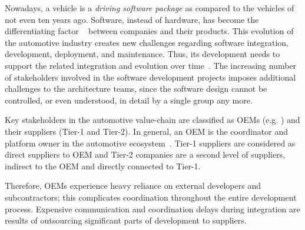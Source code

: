 Nowadays, a vehicle is a {\em driving software package} as compared to the vehicles of not even ten years ago. %
Software, instead of hardware, has become the differentiating factor%
~\cite{ConnectedVehicle2012,hbr2015hardwaresoftware,Mossinger2010SoftwareAutomotive,Broy:2006:CAS:1134285.1134292} %
between companies and their products. This evolution of the automotive industry %
creates new challenges regarding software integration, development, deployment, and maintenance. Thus, its development needs to support the related integration and evolution over time~\cite{Broy:2006:CAS:1134285.1134292,qualman2009socialnomics,JansenTale2009}. The increasing number of stakeholders involved in the software development projects imposes additional challenges to the architecture teams, since the software %
design %
cannot be controlled, or even understood, in detail by a single group any more. 

Key stakeholders in the automotive value-chain are classified as OEMs (e.g. \company{}) and their suppliers (Tier-1 and Tier-2). 
In general, an OEM is the coordinator and platform owner in the automotive ecosystem~\cite{KS15}. 
Tier-1 suppliers are considered as direct suppliers to OEM and Tier-2 companies are a second level of suppliers, indirect to the OEM and directly connected to Tier-1. 


Therefore, OEMs experience heavy reliance on external developers and subcontractors; this complicates coordination throughout the entire development process. Expensive communication and coordination delays during integration are results of outsourcing significant parts of development to suppliers. %


